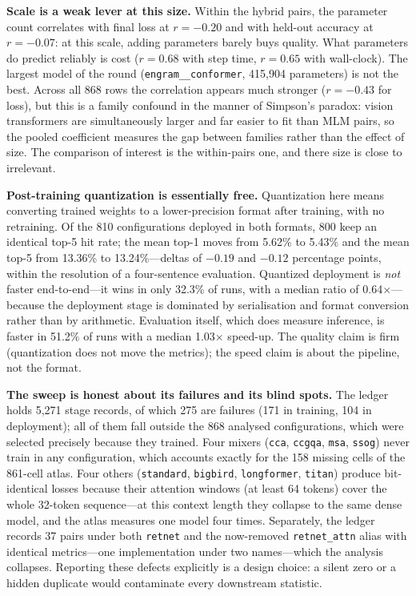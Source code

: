 \textbf{Scale is a weak lever at this size.} Within the hybrid pairs, the parameter count correlates with final loss at $r = -0.20$ and with held-out accuracy at $r = -0.07$: at this scale, adding parameters barely buys quality. What parameters do predict reliably is cost ($r = 0.68$ with step time, $r = 0.65$ with wall-clock). The largest model of the round (\texttt{engram\_\_conformer}, 415{,}904 parameters) is not the best. Across all 868 rows the correlation appears much stronger ($r = -0.43$ for loss), but this is a family confound in the manner of Simpson's paradox: vision transformers are simultaneously larger and far easier to fit than MLM pairs, so the pooled coefficient measures the gap between families rather than the effect of size. The comparison of interest is the within-pairs one, and there size is close to irrelevant.

\textbf{Post-training quantization is essentially free.} Quantization here means converting trained weights to a lower-precision format after training, with no retraining. Of the 810 configurations deployed in both formats, 800 keep an identical top-5 hit rate; the mean top-1 moves from 5.62\% to 5.43\% and the mean top-5 from 13.36\% to 13.24\%---deltas of $-0.19$ and $-0.12$ percentage points, within the resolution of a four-sentence evaluation. Quantized deployment is \emph{not} faster end-to-end---it wins in only 32.3\% of runs, with a median ratio of 0.64$\times$---because the deployment stage is dominated by serialisation and format conversion rather than by arithmetic. Evaluation itself, which does measure inference, is faster in 51.2\% of runs with a median 1.03$\times$ speed-up. The quality claim is firm (quantization does not move the metrics); the speed claim is about the pipeline, not the format.

\textbf{The sweep is honest about its failures and its blind spots.} The ledger holds 5{,}271 stage records, of which 275 are failures (171 in training, 104 in deployment); all of them fall outside the 868 analysed configurations, which were selected precisely because they trained. Four mixers (\texttt{cca}, \texttt{ccgqa}, \texttt{msa}, \texttt{ssog}) never train in any configuration, which accounts exactly for the 158 missing cells of the 861-cell atlas. Four others (\texttt{standard}, \texttt{bigbird}, \texttt{longformer}, \texttt{titan}) produce bit-identical losses because their attention windows (at least 64 tokens) cover the whole 32-token sequence---at this context length they collapse to the same dense model, and the atlas measures one model four times. Separately, the ledger records 37 pairs under both \texttt{retnet} and the now-removed \texttt{retnet\_attn} alias with identical metrics---one implementation under two names---which the analysis collapses. Reporting these defects explicitly is a design choice: a silent zero or a hidden duplicate would contaminate every downstream statistic.

